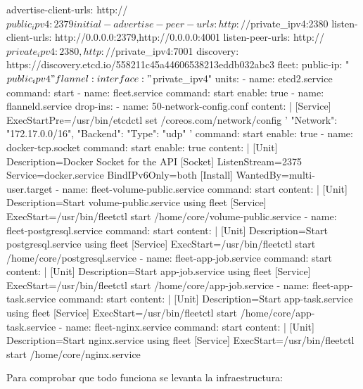 \begin{codelisting}
\begin{code}
    advertise-client-urls: http://$public_ipv4:2379
    initial-advertise-peer-urls: http://$private_ipv4:2380
    listen-client-urls: http://0.0.0.0:2379,http://0.0.0.0:4001
    listen-peer-urls: http://$private_ipv4:2380,http://$private_ipv4:7001
    discovery: https://discovery.etcd.io/558211c45a44606538213eddb032abc3
  fleet:
    public-ip: "$public_ipv4"
  flannel:
    interface: "$private_ipv4"
  units:
  - name: etcd2.service
    command: start
  - name: fleet.service
    command: start
    enable: true
  - name: flanneld.service
    drop-ins:
    - name: 50-network-config.conf
      content: |
        [Service]
        ExecStartPre=/usr/bin/etcdctl set /coreos.com/network/config 
                   '{ "Network": "172.17.0.0/16", "Backend": { "Type": "udp" } }'
    command: start
    enable: true
  - name: docker-tcp.socket
    command: start
    enable: true
    content: |
      [Unit]
      Description=Docker Socket for the API
      [Socket]
      ListenStream=2375
      Service=docker.service
      BindIPv6Only=both
      [Install]
      WantedBy=multi-user.target
  - name: fleet-volume-public.service
    command: start
    content: |
      [Unit]
      Description=Start volume-public.service using fleet
      [Service]
      ExecStart=/usr/bin/fleetctl start /home/core/volume-public.service
  - name: fleet-postgresql.service
    command: start
    content: |
      [Unit]
      Description=Start postgresql.service using fleet
      [Service]
      ExecStart=/usr/bin/fleetctl start /home/core/postgresql.service
  - name: fleet-app-job.service
    command: start
    content: |
      [Unit]
      Description=Start app-job.service using fleet
      [Service]
      ExecStart=/usr/bin/fleetctl start /home/core/app-job.service
  - name: fleet-app-task.service
    command: start
    content: |
      [Unit]
      Description=Start app-task.service using fleet
      [Service]
      ExecStart=/usr/bin/fleetctl start /home/core/app-task.service
  - name: fleet-nginx.service
    command: start
    content: |
      [Unit]
      Description=Start nginx.service using fleet
      [Service]
      ExecStart=/usr/bin/fleetctl start /home/core/nginx.service
\end{code}
\end{codelisting}

Para comprobar que todo funciona se levanta la infraestructura:


